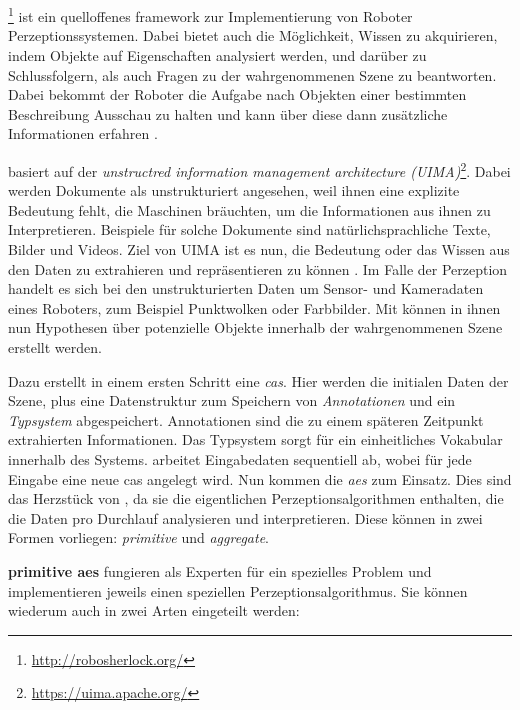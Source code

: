 \section{\robosherlock}
\label{sec:robosherlock}
\robosherlock\footnote{\url{http://robosherlock.org/}} ist ein quelloffenes \gls{framework} zur Implementierung von Roboter Perzeptionssystemen. Dabei bietet \robosherlock auch die Möglichkeit, Wissen zu akquirieren, indem Objekte auf Eigenschaften analysiert werden, und darüber zu Schlussfolgern, als auch Fragen zu der wahrgenommenen Szene zu beantworten. Dabei bekommt der Roboter die Aufgabe nach Objekten einer bestimmten Beschreibung Ausschau zu halten und kann über diese dann zusätzliche Informationen erfahren \cite{robosherlock}. \par
\robosherlock basiert auf der \textit{unstructred information management architecture (UIMA)}\footnote{\url{https://uima.apache.org/}}. Dabei werden Dokumente als unstrukturiert angesehen, weil ihnen eine explizite Bedeutung fehlt, die Maschinen bräuchten, um die Informationen aus ihnen zu Interpretieren. Beispiele für solche Dokumente sind natürlichsprachliche Texte, Bilder und Videos. Ziel von UIMA ist es nun, die Bedeutung oder das Wissen aus den Daten zu extrahieren und repräsentieren zu können \cite{UIMA}. Im Falle der Perzeption handelt es sich bei den unstrukturierten Daten um Sensor- und Kameradaten eines Roboters, zum Beispiel Punktwolken oder Farbbilder. Mit \robosherlock können in ihnen nun Hypothesen über potenzielle Objekte innerhalb der wahrgenommenen Szene erstellt werden. \par
Dazu erstellt \robosherlock in einem ersten Schritt eine \textit{\gls{cas}}. Hier werden die initialen Daten der Szene, plus eine Datenstruktur zum Speichern von \textit{Annotationen} und ein \textit{Typsystem} abgespeichert. Annotationen sind die zu einem späteren Zeitpunkt extrahierten Informationen. Das Typsystem sorgt für ein einheitliches Vokabular innerhalb des Systems. \robosherlock arbeitet Eingabedaten sequentiell ab, wobei für jede Eingabe eine neue \gls{cas} angelegt wird. \newline
Nun kommen die \textit{\glspl{ae}} zum Einsatz. Dies sind das Herzstück von \robosherlock, da sie die eigentlichen Perzeptionsalgorithmen enthalten, die die Daten pro Durchlauf analysieren und interpretieren. Diese können in zwei Formen vorliegen: \textit{primitive} und \textit{aggregate}. \par
\textbf{primitive \glspl{ae}} fungieren als Experten für ein spezielles Problem und implementieren jeweils einen speziellen Perzeptionsalgorithmus. Sie können wiederum auch in zwei Arten eingeteilt werden:
